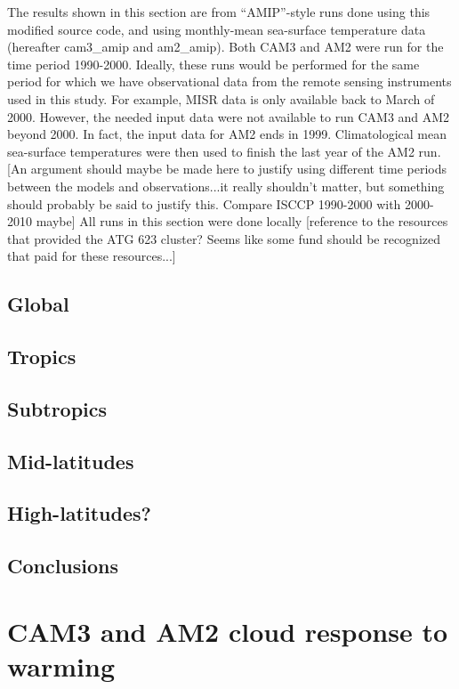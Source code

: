 The results shown in this section are from ``AMIP''-style runs done using this modified source code, and using monthly-mean sea-surface temperature data (hereafter cam3\_amip and am2\_amip). Both CAM3 and AM2 were run for the time period 1990-2000. Ideally, these runs would be performed for the same period for which we have observational data from the remote sensing instruments used in this study. For example, MISR data is only available back to March of 2000. However, the needed input data were not available to run CAM3 and AM2 beyond 2000. In fact, the input data for AM2 ends in 1999. Climatological mean sea-surface temperatures were then used to finish the last year of the AM2 run. [An argument should maybe be made here to justify using different time periods between the models and observations...it really shouldn't matter, but something should probably be said to justify this. Compare ISCCP 1990-2000 with 2000-2010 maybe] All runs in this section were done locally [reference to the resources that provided the ATG 623 cluster? Seems like some fund should be recognized that paid for these resources...]

\section{Global}
\section{Tropics}
\section{Subtropics}
\section{Mid-latitudes}
\section{High-latitudes?}
\section{Conclusions}

\chapter{CAM3 and AM2 cloud response to warming}
